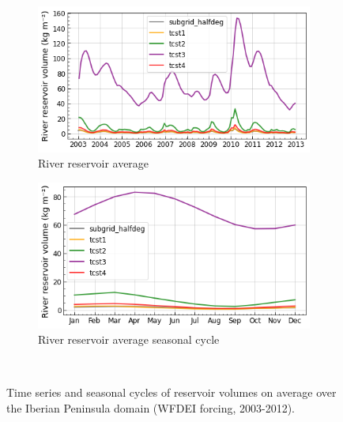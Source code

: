 \begin{figure}[htbp]
    \begin{subfigure}[b]{0.48\textwidth}
        \caption{River reservoir average}
        \includegraphics[width=\textwidth]{images/chap3/time_series/streamr_time_series_tcsts.png}
    \end{subfigure} 
    \begin{subfigure}[b]{0.48\textwidth}
        \caption{River reservoir average seasonal cycle}
        \includegraphics[width=\textwidth]{images/chap3/time_series/streamr_seasonal_cycle_tcsts.png}
    \end{subfigure} \\

    \caption{Time series and seasonal cycles of reservoir volumes on average over the Iberian Peninsula domain (WFDEI forcing, 2003-2012).}
    \label{fig:reservoir_time_series_tcsts}
\end{figure}

